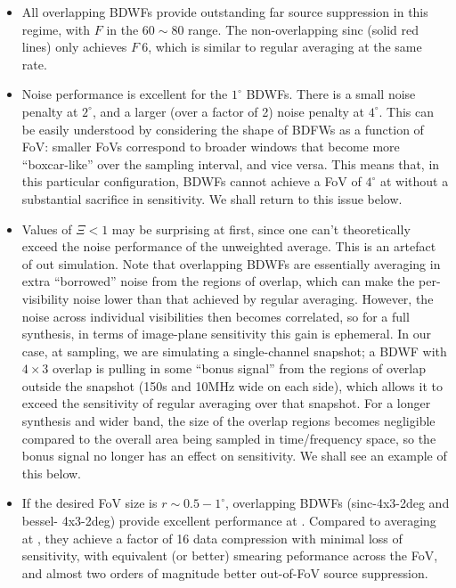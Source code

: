 \documentclass[useAMS,usenatbib]{mn2e}
\begin{document}
\begin{itemize}

\item All overlapping BDWFs provide outstanding far source suppression in this regime, with $F$ in the $60\sim80$ range. 
The non-overlapping sinc (solid red lines) only achieves $F~6$, which is similar to regular averaging
at the same rate. 

\item Noise performance is excellent for the $1^\circ$ BDWFs. There is a small noise penalty at $2^\circ$, and a larger 
(over a factor of 2) noise penalty at $4^\circ$. This can be easily understood by considering the shape of BDFWs as
a function of FoV: smaller FoVs correspond to broader windows that become more ``boxcar-like'' over the sampling
interval, and vice versa. This means that, in this particular configuration, BDWFs cannot achieve a FoV of $4^\circ$
at  without a substantial sacrifice in sensitivity. We shall return to this issue below.

\item Values of $\Xi<1$ may be surprising at first, since one can't theoretically exceed the noise performance of the
unweighted average. This is an artefact of out simulation. Note that overlapping BDWFs are essentially averaging in 
extra ``borrowed'' noise from the regions of overlap, which can make the per-visibility noise lower than that 
achieved by regular averaging. However, the noise across individual visibilities then becomes correlated, so for a 
full synthesis, in terms of image-plane sensitivity this gain is ephemeral. In our case, at  sampling, we
are simulating a single-channel snapshot; a BDWF with $4\times3$ overlap is pulling in some ``bonus signal'' from the
regions of overlap outside the snapshot (150s and 10MHz wide on each side), which allows it to exceed the sensitivity of
regular averaging over that snapshot. For a longer synthesis and wider band, the size of the overlap regions 
becomes negligible compared to the overall area being sampled in time/frequency space, so the bonus signal no longer has
an effect on sensitivity. We shall see an example of this below.

\item If the desired FoV size is $r\sim0.5-1^\circ$, overlapping BDWFs (sinc-4x3-2deg and bessel-
4x3-2deg) provide excellent performance at . Compared to averaging at , they achieve a factor
of 16 data compression with minimal loss of sensitivity, with equivalent (or better) smearing peformance across the FoV,
and almost two orders of magnitude better out-of-FoV source suppression.

\end{itemize}
\end{document}
